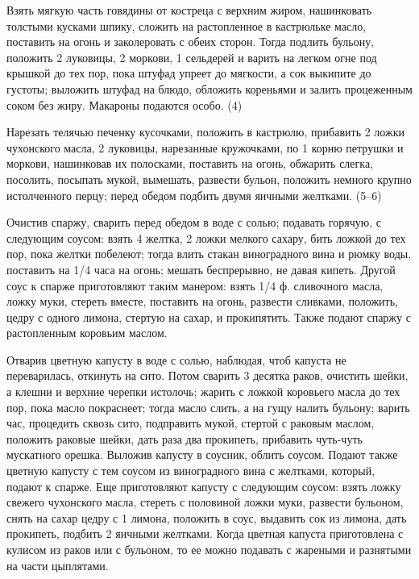 
Взять мягкую часть говядины от костреца с верхним жиром, нашинковать толстыми кусками шпику, сложить на растопленное в кастрюльке масло, поставить на огонь и заколеровать с обеих сторон. Тогда подлить бульону, положить 2 луковицы, 2 моркови, 1 сельдерей и варить на легком огне под крышкой до тех пор, пока штуфад упреет до мягкости, а сок выкипите до густоты; выложить штуфад на блюдо, обложить кореньями и залить процеженным соком без жиру. Макароны подаются особо. (4) 


Нарезать телячью печенку кусочками, положить в кастрюлю, прибавить 2 ложки чухонского масла, 2 луковицы, нарезанные кружочками, по 1 корню петрушки и моркови, нашинковав их полосками, поставить на огонь, обжарить слегка, посолить, посыпать мукой, вымешать, развести бульон, положить немного крупно истолченного перцу; перед обедом подбить двумя яичными желтками. (5--6) 


Очистив спаржу, сварить перед обедом в воде с солью; подавать горячую, с следующим соусом: взять 4 желтка, 2 ложки мелкого сахару, бить ложкой до тех пор, пока желтки побелеют; тогда влить стакан виноградного вина и рюмку воды, поставить на 1/4 часа на огонь; мешать беспрерывно, не давая кипеть. Другой соус к спарже приготовляют таким манером: взять 1/4 ф. сливочного масла, ложку муки, стереть вместе, поставить на огонь, развести сливками, положить, цедру с одного лимона, стертую на сахар, и прокипятить. Также подают спаржу с растопленным коровьим маслом. 


Отварив цветную капусту в воде с солью, наблюдая, чтоб капуста не переварилась, откинуть на сито. Потом сварить 3 десятка раков, очистить шейки, а клешни и верхние черепки истолочь; жарить с ложкой коровьего масла до тех пор, пока масло покраснеет; тогда масло слить, а на гущу налить бульону; варить час, процедить сквозь сито, подправить мукой, стертой с раковым маслом, положить раковые шейки, дать раза два прокипеть, прибавить чуть-чуть мускатного орешка. Выложив капусту в соусник, облить соусом. Подают также цветную капусту с тем соусом из виноградного вина с желтками, который, подают к спарже. Еще приготовляют капусту с следующим соусом: взять ложку свежего чухонского масла, стереть с половиной ложки муки, развести бульоном, снять на сахар цедру с 1 лимона, положить в соус, выдавить сок из лимона, дать прокипеть, подбить 2 яичными желтками. Когда цветная капуста приготовлена с кулисом из раков или с бульоном, то ее можно подавать с жареными и разнятыми на части цыплятами. 

